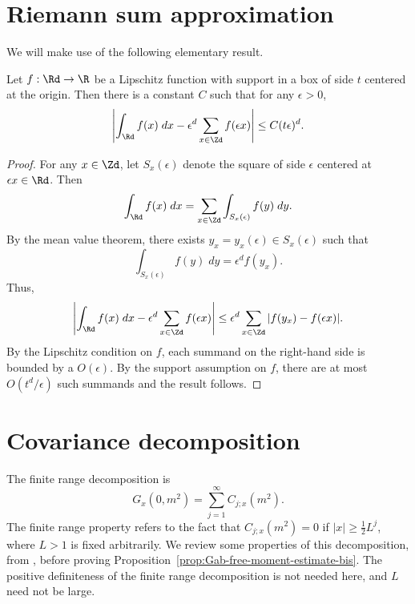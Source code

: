 \section{Riemann sum approximation}

We will make use of the following elementary result.

\begin{lemma}
Let $f : \Rd \to \R$ be a Lipschitz function with support in a box of side $t$
centered at the origin.
Then there is a constant $C$ such that for any $\epsilon > 0$,
\begin{equation}
\left|\int_\Rd f(x) \; dx - \epsilon^d \sum_{x\in\Zd} f(\epsilon x)\right|
	\le
C (t \epsilon)^d.
\end{equation}
\end{lemma}

\begin{proof}
For any $x\in\Zd$, let $S_x(\epsilon)$ denote the square of side $\epsilon$
centered at $\epsilon x\in\Rd$. Then
\begin{equation}
\int_{\Rd} f(x) \; dx
	=
\sum_{x\in\Zd} \int_{S_x(\epsilon)} f(y) \; dy.
\end{equation}
By the mean value theorem, there exists $y_x = y_x(\epsilon) \in S_x(\epsilon)$ such that
\begin{equation}
\int_{S_x(\epsilon)} f(y) \; dy
	=
\epsilon^d f(y_x).
\end{equation}
Thus,
\begin{equation}
\left|\int_\Rd f(x) \; dx - \epsilon^d \sum_{x\in\Zd} f(\epsilon x)\right|
	\le
\epsilon^d \sum_{x\in\Zd} |f(y_x) - f(\epsilon x)|.
\end{equation}
By the Lipschitz condition on $f$, each summand on the right-hand side is bounded
by a $O(\epsilon)$. By the support assumption on $f$, there are at most
$O(t^d/\epsilon)$ such summands and the result follows.
\end{proof}


\section{Covariance decomposition}

The finite range decomposition is
\begin{equation}
    G_x(0,m^2) = \sum_{j=1}^\infty C_{j;x}(m^2).
\end{equation}
The finite range property refers to the fact that $C_{j;x}(m^2) = 0$ if
$|x| \ge \frac 12 L^j$,
where $L>1$ is fixed arbitrarily.
 We review some properties of this decomposition, from
\cite{BBS-rg-pt,Baue13a}, before
proving Proposition~\ref{prop:Gab-free-moment-estimate-bis}.
The positive definiteness of the finite range
decomposition is not needed here, and $L$ need not be large.

